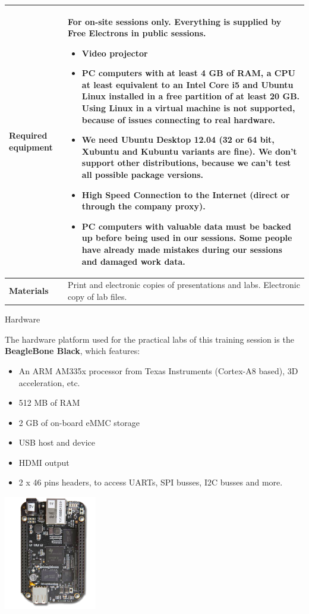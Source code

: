 \documentclass[a4paper,12pt,obeyspaces,spaces,hyphens]{article}
\begin{document}
{\begin{tabularx}{\textwidth}{|g|h|}
    {\bf Required equipment} &
    {\bf For on-site sessions only.}
    \newline Everything is supplied by Free Electrons in public
    sessions.
    \begin{itemize}
    \item Video projector
    \item PC computers with at least 4 GB of RAM, a CPU at least
      equivalent to an Intel Core i5 and Ubuntu Linux
    installed in a {\bf free partition of at least 20 GB. Using Linux
      in a virtual machine is not supported}, because of issues
    connecting to real hardware.
    \item We need Ubuntu Desktop 12.04 (32 or 64 bit, Xubuntu and
    Kubuntu variants are fine). We don't support other
    distributions, because we can't test all possible package versions.
    \item {\bf High Speed Connection to the Internet} (direct or through the
    company proxy).
    \item {\bf PC computers with valuable data must be backed up}
    before being used in our sessions.  Some people have already made
    mistakes during our sessions and damaged work data.
    \end{itemize} \\
    \hline

    {\bf Materials} & Print and electronic copies of presentations and
    labs.
    \newline Electronic copy of lab files.\\
    \hline

\end{tabularx}}
\normalsize

\feagendatwocolumn
{Hardware}
{
  The hardware platform used for the practical labs of this training
  session is the {\bf BeagleBone Black}, which features:

  \begin{itemize}
  \item An ARM AM335x processor from Texas Instruments (Cortex-A8
    based), 3D acceleration, etc.
  \item 512 MB of RAM
  \item 2 GB of on-board eMMC storage
  \item USB host and device
  \item HDMI output
  \item 2 x 46 pins headers, to access UARTs, SPI busses, I2C busses
    and more.
  \end{itemize}
}
{}
{
  \begin{center}
    \includegraphics[height=5cm]{agenda/beagleboneblack.png}
  \end{center}
}
\end{document}
